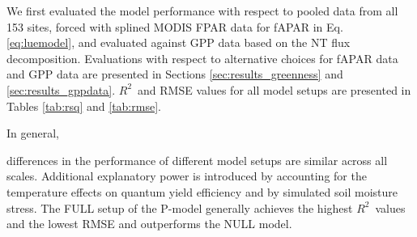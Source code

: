\documentclass{myreport}
\newcommand{\rsq}{$R^2$}
\begin{document}
We first evaluated the model performance with respect to pooled data from all 153 sites, forced with splined MODIS FPAR data for fAPAR in Eq. \ref{eq:luemodel}, and evaluated against GPP data based on the NT flux decomposition. Evaluations with respect to alternative choices for fAPAR data and GPP data are presented in Sections \ref{sec:results_greenness} and \ref{sec:results_gppdata}. \rsq\ and RMSE values for all model setups are presented in Tables \ref{tab:rsq} and \ref{tab:rmse}.

In general,


differences in the performance of different model setups are similar across all scales. Additional explanatory power is introduced by accounting for the temperature effects on quantum yield efficiency and by simulated soil moisture stress. The FULL setup of the P-model generally achieves the highest \rsq\ values and the lowest RMSE and outperforms the NULL model.


\end{document}
